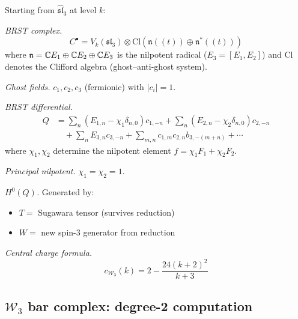 \begin{computation}\label{comp:ds-w3}
Starting from $\hat{\mathfrak{sl}}_3$ at level $k$:

\emph{BRST complex.}
\[
C^\bullet = V_k(\mathfrak{sl}_3) \otimes \mathrm{Cl}(\mathfrak{n}((t)) \oplus \mathfrak{n}^*((t)))
\]
where $\mathfrak{n} = \mathbb{C} E_1 \oplus \mathbb{C} E_2 \oplus \mathbb{C} E_3$ is the nilpotent radical ($E_3 = [E_1, E_2]$) and $\mathrm{Cl}$ denotes the Clifford algebra (ghost--anti-ghost system).

\emph{Ghost fields.} $c_1, c_2, c_3$ (fermionic) with $|c_i| = 1$.

\emph{BRST differential.}
\begin{align*}
Q &= \sum_n (E_{1,n} - \chi_1\delta_{n,0})c_{1,-n} + \sum_n (E_{2,n} - \chi_2\delta_{n,0})c_{2,-n} \\
&\quad + \sum_n E_{3,n} c_{3,-n} + \sum_{m,n} c_{1,m}c_{2,n}b_{3,-(m+n)} + \cdots
\end{align*}
where $\chi_1, \chi_2$ determine the nilpotent element $f = \chi_1 F_1 + \chi_2 F_2$.

\emph{Principal nilpotent.} $\chi_1 = \chi_2 = 1$.

\emph{$H^0(Q)$.} Generated by:
\begin{itemize}
\item $T = $ Sugawara tensor (survives reduction)
\item $W = $ new spin-3 generator from reduction
\end{itemize}

\emph{Central charge formula.}
\[
c_{\mathcal{W}_3}(k) = 2 - \frac{24(k+2)^2}{k+3}
\]
\end{computation}


\subsection{\texorpdfstring{$\mathcal{W}_3$ bar complex: degree-2 computation}{W-3 bar complex: degree-2 computation}}

